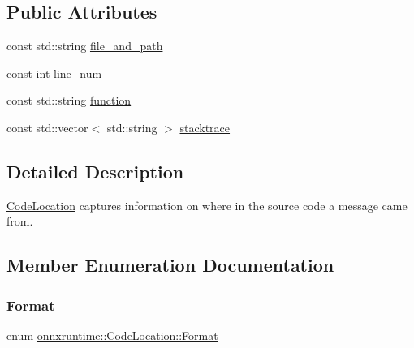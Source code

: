 \subsection*{Public Attributes}
\begin{DoxyCompactItemize}
\item 
const std\+::string \mbox{\hyperlink{structonnxruntime_1_1CodeLocation_aeed1a7d30e1e239744907a5ed83072e7}{file\+\_\+and\+\_\+path}}
\item 
const int \mbox{\hyperlink{structonnxruntime_1_1CodeLocation_ab57d004c58c1a079d3114d560ec7c0da}{line\+\_\+num}}
\item 
const std\+::string \mbox{\hyperlink{structonnxruntime_1_1CodeLocation_a1df4eb946576e7098bab28cbe8ab5af4}{function}}
\item 
const std\+::vector$<$ std\+::string $>$ \mbox{\hyperlink{structonnxruntime_1_1CodeLocation_a51bb351d8b54b29b60dc090a690fc43b}{stacktrace}}
\end{DoxyCompactItemize}


\subsection{Detailed Description}
\mbox{\hyperlink{structonnxruntime_1_1CodeLocation}{Code\+Location}} captures information on where in the source code a message came from. 

\subsection{Member Enumeration Documentation}
\mbox{\label{structonnxruntime_1_1CodeLocation_a3fb5bf51b3528e696939e0c2daac28d5}} 
\subsubsection{\texorpdfstring{Format}{Format}}
{\footnotesize\ttfamily enum \mbox{\hyperlink{structonnxruntime_1_1CodeLocation_a3fb5bf51b3528e696939e0c2daac28d5}{onnxruntime\+::\+Code\+Location\+::\+Format}}}

